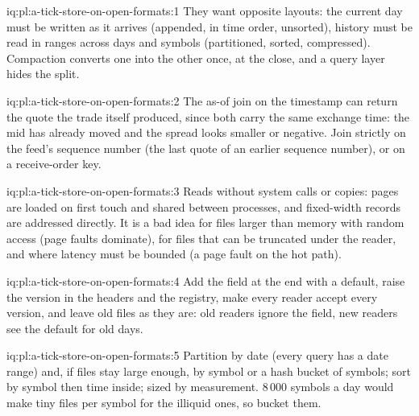 \begin{solution}{iq:pl:a-tick-store-on-open-formats:1}
They want opposite layouts: the current day must be written as it arrives (appended, in time order, unsorted), history must be
read in ranges across days and symbols (partitioned, sorted, compressed). Compaction converts one into the other once, at the
close, and a query layer hides the split.
\end{solution}

\begin{solution}{iq:pl:a-tick-store-on-open-formats:2}
The as-of join on the timestamp can return the quote the trade itself produced, since both carry the same exchange time: the mid
has already moved and the spread looks smaller or negative. Join strictly on the feed's sequence number (the last quote of an
earlier sequence number), or on a receive-order key.
\end{solution}

\begin{solution}{iq:pl:a-tick-store-on-open-formats:3}
Reads without system calls or copies: pages are loaded on first touch and shared between processes, and fixed-width records are
addressed directly. It is a bad idea for files larger than memory with random access (page faults dominate), for files that can be
truncated under the reader, and where latency must be bounded (a page fault on the hot path).
\end{solution}

\begin{solution}{iq:pl:a-tick-store-on-open-formats:4}
Add the field at the end with a default, raise the version in the headers and the registry, make every reader accept every
version, and leave old files as they are: old readers ignore the field, new readers see the default for old days.
\end{solution}

\begin{solution}{iq:pl:a-tick-store-on-open-formats:5}
Partition by date (every query has a date range) and, if files stay large enough, by symbol or a hash bucket of symbols; sort by
symbol then time inside;  sized by measurement. 8\,000 symbols a day would make tiny files per symbol for the illiquid
ones, so bucket them.
\end{solution}

